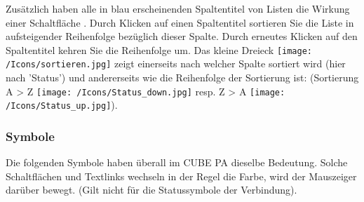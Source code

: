 Zusätzlich haben alle in blau erscheinenden Spaltentitel von Listen die Wirkung einer Schaltfläche . Durch Klicken auf einen Spaltentitel sortieren Sie die
Liste in aufsteigender Reihenfolge bezüglich dieser Spalte. Durch erneutes Klicken auf den Spaltentitel kehren Sie die Reihenfolge um. Das kleine Dreieck \texttt{[image: /Icons/sortieren.jpg]}  zeigt einerseits nach welcher Spalte sortiert wird (hier nach 'Status') und andererseits wie die Reihenfolge der Sortierung ist: (Sortierung A {\textgreater} Z \texttt{[image: /Icons/Status\_down.jpg]} resp. Z {\textgreater} A \texttt{[image: /Icons/Status\_up.jpg]}).

\pagebreak
\subsubsection{Symbole}
\label{bkm:Ref443039356}
Die folgenden Symbole haben überall im CUBE PA dieselbe Bedeutung. Solche Schaltflächen und Textlinks wechseln in der Regel die Farbe, wird der Mauszeiger darüber bewegt. (Gilt nicht für die Statussymbole der Verbindung). 

